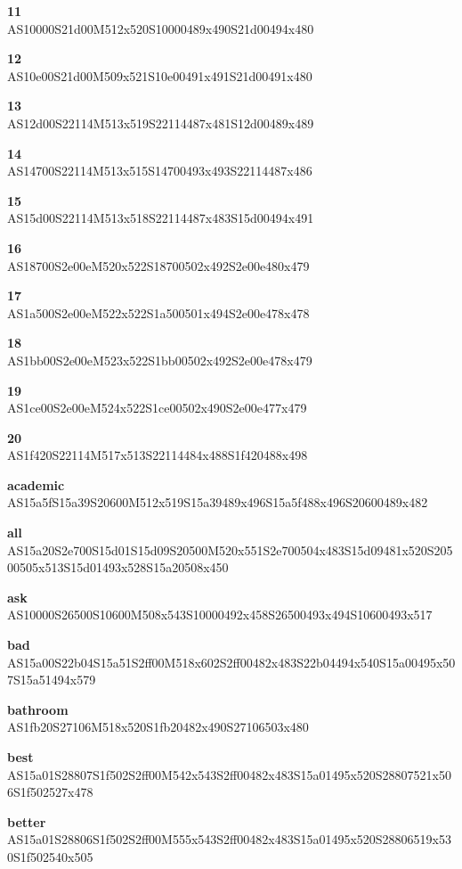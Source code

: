 \documentclass{article}
\begin{document}
\begin{glossary}

\textbf{11}\\
AS10000S21d00M512x520S10000489x490S21d00494x480

\textbf{12}\\
AS10e00S21d00M509x521S10e00491x491S21d00491x480

\textbf{13}\\
AS12d00S22114M513x519S22114487x481S12d00489x489

\textbf{14}\\
AS14700S22114M513x515S14700493x493S22114487x486

\textbf{15}\\
AS15d00S22114M513x518S22114487x483S15d00494x491

\textbf{16}\\
AS18700S2e00eM520x522S18700502x492S2e00e480x479

\textbf{17}\\
AS1a500S2e00eM522x522S1a500501x494S2e00e478x478

\textbf{18}\\
AS1bb00S2e00eM523x522S1bb00502x492S2e00e478x479

\textbf{19}\\
AS1ce00S2e00eM524x522S1ce00502x490S2e00e477x479

\textbf{20}\\
AS1f420S22114M517x513S22114484x488S1f420488x498

\textbf{academic}\\
AS15a5fS15a39S20600M512x519S15a39489x496S15a5f488x496S20600489x482

\textbf{all}\\
AS15a20S2e700S15d01S15d09S20500M520x551S2e700504x483S15d09481x520S20500505x513S15d01493x528S15a20508x450

\textbf{ask}\\
AS10000S26500S10600M508x543S10000492x458S26500493x494S10600493x517

\textbf{bad}\\
AS15a00S22b04S15a51S2ff00M518x602S2ff00482x483S22b04494x540S15a00495x507S15a51494x579

\textbf{bathroom}\\
AS1fb20S27106M518x520S1fb20482x490S27106503x480

\textbf{best}\\
AS15a01S28807S1f502S2ff00M542x543S2ff00482x483S15a01495x520S28807521x506S1f502527x478

\textbf{better}\\
AS15a01S28806S1f502S2ff00M555x543S2ff00482x483S15a01495x520S28806519x530S1f502540x505


\end{glossary}
\end{document}

